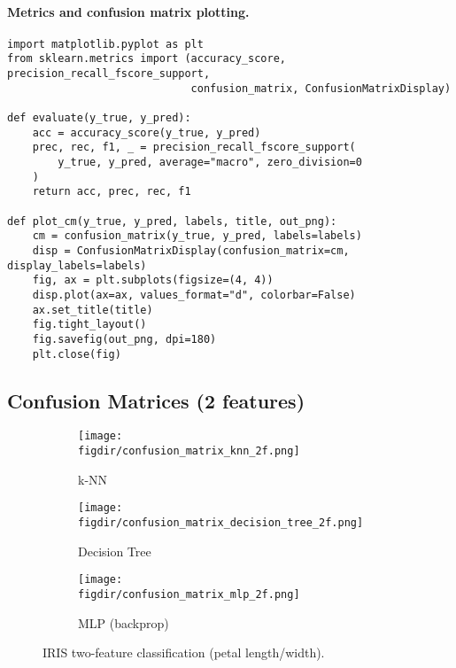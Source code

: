 \documentclass[11pt,a4paper]{article}
\newcommand{\figdir}{figures}
\begin{document}
\paragraph{Metrics and confusion matrix plotting.}
\begin{lstlisting}[style=mypython,caption={Metrics and confusion matrix utility},label={lst:iris-metrics}]
import matplotlib.pyplot as plt
from sklearn.metrics import (accuracy_score, precision_recall_fscore_support,
                             confusion_matrix, ConfusionMatrixDisplay)

def evaluate(y_true, y_pred):
    acc = accuracy_score(y_true, y_pred)
    prec, rec, f1, _ = precision_recall_fscore_support(
        y_true, y_pred, average="macro", zero_division=0
    )
    return acc, prec, rec, f1

def plot_cm(y_true, y_pred, labels, title, out_png):
    cm = confusion_matrix(y_true, y_pred, labels=labels)
    disp = ConfusionMatrixDisplay(confusion_matrix=cm, display_labels=labels)
    fig, ax = plt.subplots(figsize=(4, 4))
    disp.plot(ax=ax, values_format="d", colorbar=False)
    ax.set_title(title)
    fig.tight_layout()
    fig.savefig(out_png, dpi=180)
    plt.close(fig)
\end{lstlisting}

\subsection{Confusion Matrices (2 features)}
\begin{figure}[H]\centering
  \begin{subfigure}{.32\linewidth}
    \texttt{[image: \\figdir/confusion\_matrix\_knn\_2f.png]}
    \caption{k-NN}
  \end{subfigure}\hfill
  \begin{subfigure}{.32\linewidth}
    \texttt{[image: \\figdir/confusion\_matrix\_decision\_tree\_2f.png]}
    \caption{Decision Tree}
  \end{subfigure}\hfill
  \begin{subfigure}{.32\linewidth}
    \texttt{[image: \\figdir/confusion\_matrix\_mlp\_2f.png]}
    \caption{MLP (backprop)}
  \end{subfigure}
  \caption{IRIS two-feature classification (petal length/width).}
\end{figure}
\end{document}
